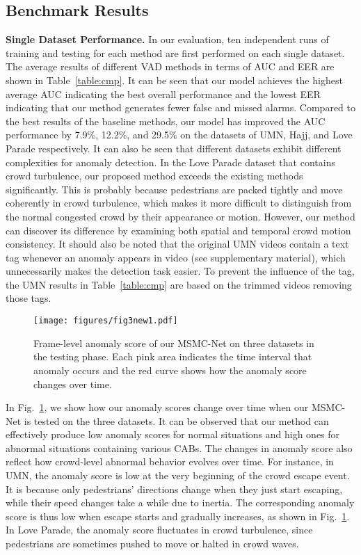 \documentclass[journal]{IEEEtran}
\begin{document}
\subsection{Benchmark Results}
\noindent \textbf{Single Dataset Performance.} In our evaluation, ten independent runs of training and testing for each method are first performed on each single dataset. The average results of different VAD methods in terms of AUC and EER are shown in Table~\ref{table:cmp}.
It can be seen that our model achieves the highest average AUC indicating the best overall performance and the lowest EER indicating that our method generates fewer false and missed alarms. 
Compared to the best results of the baseline methods, our model has improved the AUC performance by 7.9\%, 12.2\%, and 29.5\% on the datasets of UMN, Hajj, and Love Parade respectively. 
It can also be seen that different datasets exhibit different complexities for anomaly detection. In the Love Parade dataset that contains crowd turbulence, our proposed method exceeds the existing methods significantly. This is probably because pedestrians are packed tightly and move coherently in crowd turbulence, which makes it more difficult to distinguish from the normal congested crowd by their appearance or motion. However, our method can discover its difference by examining both spatial and temporal crowd motion consistency. It should also be noted that the original UMN videos contain a text tag whenever an anomaly appears in video (see supplementary material), which unnecessarily makes the detection task easier. To prevent the influence of the tag, the UMN results in Table~\ref{table:cmp} are based on the trimmed videos removing those tags.

\begin{figure}[t] %
\centering
\texttt{[image: figures/fig3new1.pdf]}
\caption{
Frame-level anomaly score of our MSMC-Net on three datasets in the testing phase. Each pink area indicates the time interval that anomaly occurs and the red curve shows how the anomaly score changes over time.}
\label{cmp}
\end{figure}

In Fig.~\ref{cmp}, we show how our anomaly scores change over time when our MSMC-Net is tested on the three datasets. It can be observed that our method can effectively produce low anomaly scores for normal situations and high ones for abnormal situations containing various CABs. The changes in anomaly score also reflect how crowd-level abnormal behavior evolves over time. For instance, in UMN, the anomaly score is low at the very beginning of the crowd escape event. It is because only pedestrians' directions change when they just start escaping, while their speed changes take a while due to inertia. The corresponding anomaly score is thus low when escape starts and gradually increases, as shown in Fig.~\ref{cmp}. In Love Parade, the anomaly score fluctuates in crowd turbulence, since pedestrians are sometimes pushed to move or halted in crowd waves.
\end{document}
